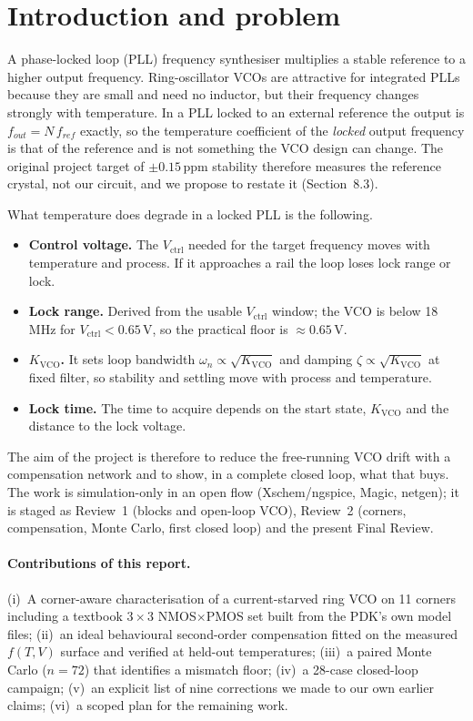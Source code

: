 \documentclass[11pt,a4paper]{article}
\newcommand{\kvco}{K_{\mathrm{VCO}}}
\newcommand{\vc}{V_{\mathrm{ctrl}}}
\begin{document}
\vspace{4pt}

\section{Introduction and problem}
A phase-locked loop (PLL) frequency synthesiser multiplies a stable reference to a higher output frequency. Ring-oscillator VCOs are attractive for integrated PLLs because they are small and need no inductor, but their frequency changes strongly with temperature. In a PLL locked to an external reference the output is $f_{out}=N\,f_{ref}$ exactly, so the temperature coefficient of the \emph{locked} output frequency is that of the reference and is not something the VCO design can change. The original project target of $\pm0.15$\,ppm stability therefore measures the reference crystal, not our circuit, and we propose to restate it (Section~8.3).

What temperature does degrade in a locked PLL is the following.
\begin{itemize}
\item \textbf{Control voltage.} The $\vc$ needed for the target frequency moves with temperature and process. If it approaches a rail the loop loses lock range or lock.
\item \textbf{Lock range.} Derived from the usable $\vc$ window; the VCO is below 18\,MHz for $\vc<0.65$\,V, so the practical floor is $\approx0.65$\,V.
\item \textbf{$\kvco$.} It sets loop bandwidth $\omega_n\propto\sqrt{\kvco}$ and damping $\zeta\propto\sqrt{\kvco}$ at fixed filter, so stability and settling move with process and temperature.
\item \textbf{Lock time.} The time to acquire depends on the start state, $\kvco$ and the distance to the lock voltage.
\end{itemize}
The aim of the project is therefore to reduce the free-running VCO drift with a compensation network and to show, in a complete closed loop, what that buys. The work is simulation-only in an open flow (Xschem/ngspice, Magic, netgen); it is staged as Review~1 (blocks and open-loop VCO), Review~2 (corners, compensation, Monte Carlo, first closed loop) and the present Final Review.

\paragraph{Contributions of this report.} (i)~A corner-aware characterisation of a current-starved ring VCO on 11 corners including a textbook $3\times3$ NMOS$\times$PMOS set built from the PDK's own model files; (ii)~an ideal behavioural second-order compensation fitted on the measured $f(T,V)$ surface and verified at held-out temperatures; (iii)~a paired Monte Carlo ($n=72$) that identifies a mismatch floor; (iv)~a 28-case closed-loop campaign; (v)~an explicit list of nine corrections we made to our own earlier claims; (vi)~a scoped plan for the remaining work.
\end{document}
